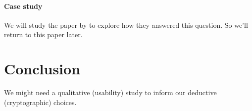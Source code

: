 \paragraph{Case study}

We will study the paper by \textcite{WhyPhishingWorks} to explore how they 
answered this question.
So we'll return to this paper later.


\section{Conclusion}

\begin{frame}
  We might need a qualitative (\eg usability) study
  to inform our deductive (\eg cryptographic) choices.
\end{frame}

